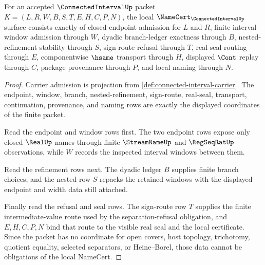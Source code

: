 \begin{theorem}
\label{thm:connected-interval-namecert-obligations}
For an accepted $\ConnectedIntervalUp$ packet $K=(L,R,W,B,S,T,E,H,C,P,N)$, the local $\NameCert_{\ConnectedIntervalUp}$ surface consists exactly of closed endpoint admission for $L$ and $R$, finite interval-window admission through $W$, dyadic branch-ledger exactness through $B$, nested-refinement stability through $S$, sign-route refusal through $T$, real-seal routing through $E$, componentwise $\hsame$ transport through $H$, displayed $\Cont$ replay through $C$, package provenance through $P$, and local naming through $N$.
\end{theorem}
\begin{proof}
Carrier admission is projection from \autoref{def:connected-interval-carrier}. The endpoint, window, branch, nested-refinement, sign-route, real-seal, transport, continuation, provenance, and naming rows are exactly the displayed coordinates of the finite packet.

Read the endpoint and window rows first. The two endpoint rows expose only closed $\RealUp$ names through finite $\StreamNameUp$ and $\RegSeqRatUp$ observations, while $W$ records the inspected interval windows between them.

Read the refinement rows next. The dyadic ledger $B$ supplies finite branch choices, and the nested row $S$ repacks the retained windows with the displayed endpoint and width data still attached.

Finally read the refusal and seal rows. The sign-route row $T$ supplies the finite intermediate-value route used by the separation-refusal obligation, and $E,H,C,P,N$ bind that route to the visible real seal and the local certificate. Since the packet has no coordinate for open covers, host topology, trichotomy, quotient equality, selected separators, or Heine--Borel, those data cannot be obligations of the local NameCert.
\end{proof}

